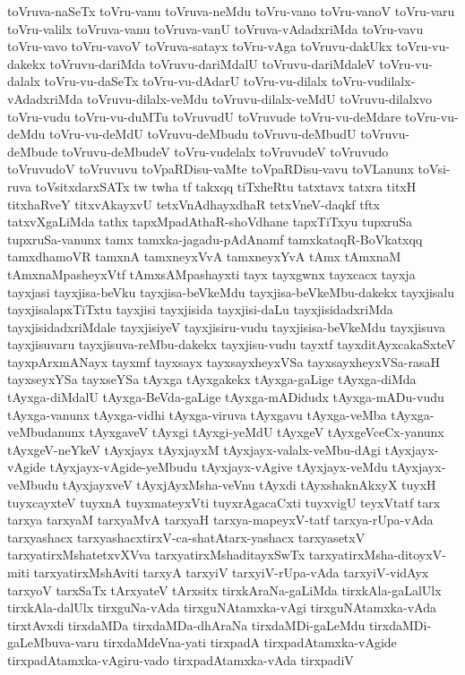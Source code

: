 {toVruva-naSeTx
toVru-vanu
toVruva-neMdu
toVru-vano
toVru-vanoV
toVru-varu
toVru-valilx
toVruva-vanu
toVruva-vanU
toVruva-vAdadxriMda
toVru-vavu
toVru-vavo
toVru-vavoV
toVruva-satayx
toVru-vAga
toVruvu-dakUkx
toVru-vu-dakekx
toVruvu-dariMda
toVruvu-dariMdalU
toVruvu-dariMdaleV
toVru-vu-dalalx
toVru-vu-daSeTx
toVru-vu-dAdarU
toVru-vu-dilalx
toVru-vudilalx-vAdadxriMda
toVruvu-dilalx-veMdu
toVruvu-dilalx-veMdU
toVruvu-dilalxvo
toVru-vudu
toVru-vu-duMTu
toVruvudU
toVruvude
toVru-vu-deMdare
toVru-vu-deMdu
toVru-vu-deMdU
toVruvu-deMbudu
toVruvu-deMbudU
toVruvu-deMbude
toVruvu-deMbudeV
toVru-vudelalx
toVruvudeV
toVruvudo
toVruvudoV
toVruvuvu
toVpaRDisu-vaMte
toVpaRDisu-vavu
toVLanunx
toVsi-ruva
toVsitxdarxSATx
tw
twha
tf
takxqq
tiTxheRtu
tatxtavx
tatxra
titxH
titxhaRveY
titxvAkayxvU
tetxVnAdhayxdhaR
tetxVneV-daqkf
tftx
tatxvXgaLiMda
tathx
tapxMpadAthaR-shoVdhane
tapxTiTxyu
tupxruSa
tupxruSa-vanunx
tamx
tamxka-jagadu-pAdAnamf
tamxkataqR-BoVkatxqq
tamxdhamoVR
tamxnA
tamxneyxVvA
tamxneyxYvA
tAmx
tAmxnaM
tAmxnaMpasheyxVtf
tAmxsAMpashayxti
tayx
tayxgwnx
tayxcacx
tayxja
tayxjasi
tayxjisa-beVku
tayxjisa-beVkeMdu
tayxjisa-beVkeMbu-dakekx
tayxjisalu
tayxjisalapxTiTxtu
tayxjisi
tayxjisida
tayxjisi-daLu
tayxjisidadxriMda
tayxjisidadxriMdale
tayxjisiyeV
tayxjisiru-vudu
tayxjisisa-beVkeMdu
tayxjisuva
tayxjisuvaru
tayxjisuva-reMbu-dakekx
tayxjisu-vudu
tayxtf
tayxditAyxcakaSxteV
tayxpArxmANayx
tayxmf
tayxsayx
tayxsayxheyxVSa
tayxsayxheyxVSa-rasaH
tayxseyxYSa
tayxseYSa
tAyxga
tAyxgakekx
tAyxga-gaLige
tAyxga-diMda
tAyxga-diMdalU
tAyxga-BeVda-gaLige
tAyxga-mADidudx
tAyxga-mADu-vudu
tAyxga-vanunx
tAyxga-vidhi
tAyxga-viruva
tAyxgavu
tAyxga-veMba
tAyxga-veMbudanunx
tAyxgaveV
tAyxgi
tAyxgi-yeMdU
tAyxgeV
tAyxgeVceCx-yanunx
tAyxgeV-neYkeV
tAyxjayx
tAyxjayxM
tAyxjayx-valalx-veMbu-dAgi
tAyxjayx-vAgide
tAyxjayx-vAgide-yeMbudu
tAyxjayx-vAgive
tAyxjayx-veMdu
tAyxjayx-veMbudu
tAyxjayxveV
tAyxjAyxMsha-veVnu
tAyxdi
tAyxshaknAkxyX
tuyxH
tuyxcayxteV
tuyxnA
tuyxmateyxVti
tuyxrAgacaCxti
tuyxvigU
teyxVtatf
tarx
tarxya
tarxyaM
tarxyaMvA
tarxyaH
tarxya-mapeyxV-tatf
tarxya-rUpa-vAda
tarxyashacx
tarxyashacxtirxV-ca-shatAtarx-yashacx
tarxyasetxV
tarxyatirxMshatetxvXVva
tarxyatirxMshaditayxSwTx
tarxyatirxMsha-ditoyxV-miti
tarxyatirxMshAviti
tarxyA
tarxyiV
tarxyiV-rUpa-vAda
tarxyiV-vidAyx
tarxyoV
tarxSaTx
tArxyateV
tArxsitx
tirxkAraNa-gaLiMda
tirxkAla-gaLalUlx
tirxkAla-dalUlx
tirxguNa-vAda
tirxguNAtamxka-vAgi
tirxguNAtamxka-vAda
tirxtAvxdi
tirxdaMDa
tirxdaMDa-dhAraNa
tirxdaMDi-gaLeMdu
tirxdaMDi-gaLeMbuva-varu
tirxdaMdeVna-yati
tirxpadA
tirxpadAtamxka-vAgide
tirxpadAtamxka-vAgiru-vado
tirxpadAtamxka-vAda
tirxpadiV
}

